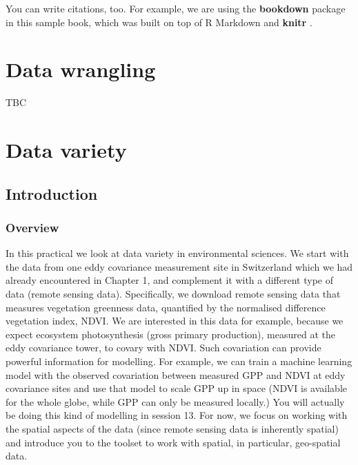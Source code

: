 \documentclass[
]{book}
\begin{document}
You can write citations, too. For example, we are using the \textbf{bookdown} package \citep{R-bookdown} in this sample book, which was built on top of R Markdown and \textbf{knitr} \citep{xie2015}.

\hypertarget{data-wrangling}{%
\chapter{Data wrangling}\label{data-wrangling}}

TBC

\hypertarget{data-variety}{%
\chapter{Data variety}\label{data-variety}}

\hypertarget{introduction}{%
\section{Introduction}\label{introduction}}

\hypertarget{overview}{%
\subsection{Overview}\label{overview}}

In this practical we look at data variety in environmental sciences. We start with the data from one eddy covariance measurement site in Switzerland which we had already encountered in Chapter 1, and complement it with a different type of data (remote sensing data). Specifically, we download remote sensing data that measures vegetation greenness data, quantified by the normalised difference vegetation index, NDVI. We are interested in this data for example, because we expect ecosystem photosynthesis (gross primary production), measured at the eddy covariance tower, to covary with NDVI. Such covariation can provide powerful information for modelling. For example, we can train a machine learning model with the observed covariation between measured GPP and NDVI at eddy covariance sites and use that model to scale GPP up in space (NDVI is available for the whole globe, while GPP can only be measured locally.) You will actually be doing this kind of modelling in session 13. For now, we focus on working with the spatial aspects of the data (since remote sensing data is inherently spatial) and introduce you to the toolset to work with spatial, in particular, geo-spatial data.
\end{document}
